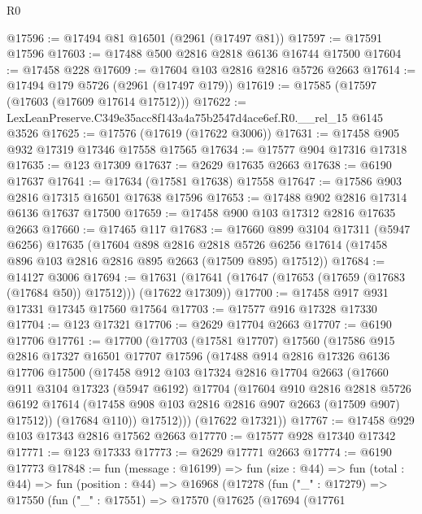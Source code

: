 \begin{lexlean}{R0}
\begin{coremodule}
@17596 := @17494 @81 @16501 (@2961 (@17497 @81))
@17597 := @17591 @17596
@17603 := @17488 @500 @2816 @2818 @6136 @16744 @17500
@17604 := @17458 @228
@17609 := @17604 @103 @2816 @2816 @5726 @2663
@17614 := @17494 @179 @5726 (@2961 (@17497 @179))
@17619 := @17585 (@17597 (@17603 (@17609 @17614 @17512)))
@17622 := LexLeanPreserve.C349e35acc8f143a4a75b2547d4ace6ef.R0.__rel_15 @6145 @3526
@17625 := @17576 (@17619 (@17622 @3006))
@17631 := @17458 @905 @932 @17319 @17346 @17558 @17565
@17634 := @17577 @904 @17316 @17318
@17635 := @123 @17309
@17637 := @2629 @17635 @2663
@17638 := @6190 @17637
@17641 := @17634 (@17581 @17638) @17558
@17647 := @17586 @903 @2816 @17315 @16501 @17638 @17596
@17653 := @17488 @902 @2816 @17314 @6136 @17637 @17500
@17659 := @17458 @900 @103 @17312 @2816 @17635 @2663
@17660 := @17465 @117
@17683 := @17660
    @899
    @3104
    @17311
    (@5947 @6256)
    @17635
    (@17604
      @898
      @2816
      @2818
      @5726
      @6256
      @17614
      (@17458 @896 @103 @2816 @2816 @895 @2663 (@17509 @895) @17512))
@17684 := @14127 @3006
@17694 := @17631 (@17641 (@17647 (@17653 (@17659 (@17683 (@17684 @50)) @17512))) (@17622 @17309))
@17700 := @17458 @917 @931 @17331 @17345 @17560 @17564
@17703 := @17577 @916 @17328 @17330
@17704 := @123 @17321
@17706 := @2629 @17704 @2663
@17707 := @6190 @17706
@17761 := @17700
    (@17703
      (@17581 @17707)
      @17560
      (@17586
        @915
        @2816
        @17327
        @16501
        @17707
        @17596
        (@17488
          @914
          @2816
          @17326
          @6136
          @17706
          @17500
          (@17458
            @912
            @103
            @17324
            @2816
            @17704
            @2663
            (@17660
              @911
              @3104
              @17323
              (@5947 @6192)
              @17704
              (@17604
                @910
                @2816
                @2818
                @5726
                @6192
                @17614
                (@17458 @908 @103 @2816 @2816 @907 @2663 (@17509 @907) @17512))
              (@17684 @110))
            @17512)))
      (@17622 @17321))
@17767 := @17458 @929 @103 @17343 @2816 @17562 @2663
@17770 := @17577 @928 @17340 @17342
@17771 := @123 @17333
@17773 := @2629 @17771 @2663
@17774 := @6190 @17773
@17848 := fun (message : @16199) =>
  fun (size : @44) =>
  fun (total : @44) =>
  fun (position : @44) =>
  @16968
    (@17278
      (fun ("_" : @17279) =>
      @17550
        (fun ("_" : @17551) =>
        @17570
          (@17625
            (@17694
              (@17761

\end{coremodule}
\end{lexlean}
